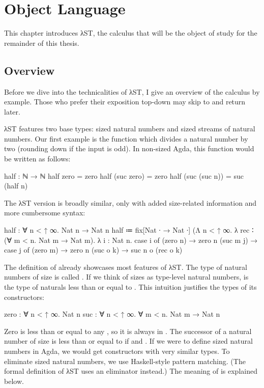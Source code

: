 \chapter{Object Language}
\label{sec:source}

This chapter introduces λST, the calculus that will be the object of study for
the remainder of this thesis.


\section{Overview}
\label{sec:source:overview}

Before we dive into the technicalities of λST, I give an overview of the
calculus by example. Those who prefer their exposition top-down may skip to
 and return later.

λST features two base types: sized natural numbers and sized streams of natural
numbers. Our first example is the function  which divides a natural
number by two (rounding down if the input is odd). In non-sized Agda, this
function would be written as follows:
\begin{code}
  half : ℕ → ℕ
  half zero = zero
  half (suc zero) = zero
  half (suc (suc n)) = suc (half n)
\end{code}
The λST version is broadly similar, only with added size-related information and
more cumbersome syntax:
\begin{code}
  half : ∀ n < ↑ ∞. Nat n → Nat n
  half ≔ fix[Nat ∙ → Nat ∙]
          (Λ n < ↑ ∞. λ rec ∶ (∀ m < n. Nat m → Nat m). λ i : Nat n.
            case i of
              (zero n) → zero n
              (suc m j) →
                case j of
                  (zero m) → zero n
                  (suc o k) → suc n o (rec o k)
\end{code}

The definition of  already showcases most features of λST. The type
of natural numbers of size  is called . If we think of
sizes as type-level natural numbers,  is the type of naturals less
than or equal to . This intuition justifies the types of its
constructors:
\begin{code}
  zero : ∀ n < ↑ ∞. Nat n
  suc  : ∀ n < ↑ ∞. ∀ m < n. Nat m → Nat n
\end{code}
Zero is less than or equal to any , so it is always in .
The successor of a natural number  of size  is less than or
equal to  if and . If we were to define sized natural
numbers in Agda, we would get constructors with very similar types. To eliminate
sized natural numbers, we use Haskell-style pattern matching. (The formal
definition of λST uses an eliminator instead.) The meaning of  is
explained below.


